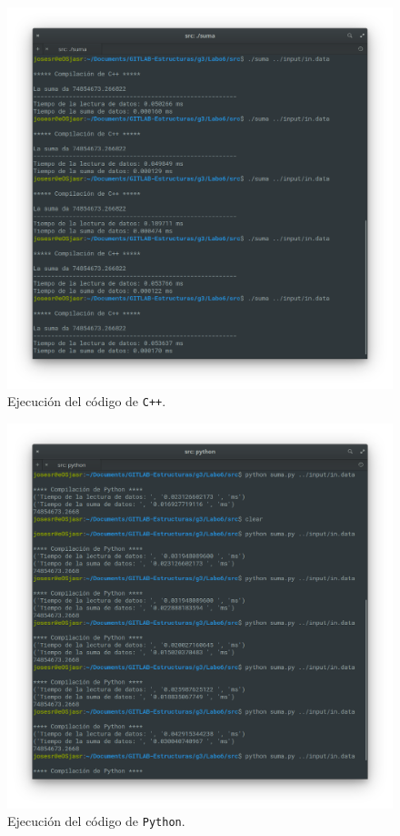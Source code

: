 \begin{figure}[H]
\centering
\includegraphics[width=\textwidth]{imgs/Labo6/resCPP.png}
\caption{Ejecución del código de \texttt{C++}.}
\label{fig:C++}
\end{figure}

\begin{figure}[H]
\centering
\includegraphics[width=\textwidth]{imgs/Labo6/resPY.png}
\caption{Ejecución del código de \texttt{Python}.}
\label{fig:Py}
\end{figure}

